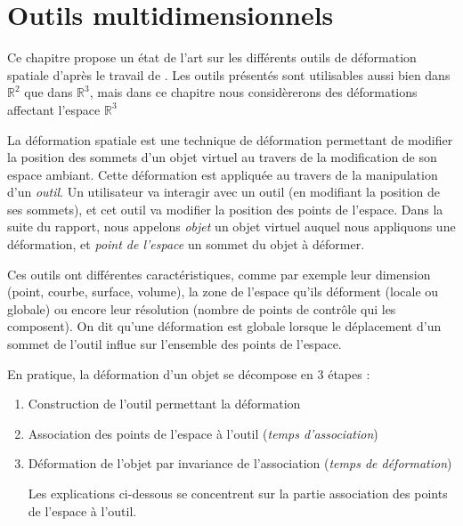

\chapter{Outils multidimensionnels}

\graphicspath{{Chapter1/Chapter1Figs/PNG/}{Chapter1/Chapter1Figs/PDF/}{Chapter1/Chapter1Figs/}}

Ce chapitre propose un état de l'art sur les différents outils de déformation
spatiale d'après le travail de \cite{GB08}. Les outils présentés sont
utilisables aussi bien dans $\mathbb{R}^2$ que dans $\mathbb{R}^3$, mais dans
ce chapitre nous considèrerons des déformations affectant l'espace
$\mathbb{R}^3$

La déformation spatiale est une technique de déformation permettant de
modifier la position des sommets d'un objet virtuel au travers de la
modification de son espace ambiant. Cette déformation est appliquée au travers
de la manipulation d'un \textit{outil}. Un utilisateur va interagir avec un
outil (en modifiant la position de ses sommets), et cet outil va modifier la
position des points de l'espace. Dans la suite du rapport, nous appelons
\textit{objet} un objet virtuel auquel nous appliquons une déformation, et
\textit{point de l'espace} un sommet du objet à déformer.

Ces outils ont différentes caractéristiques, comme par exemple leur dimension
(point, courbe, surface, volume), la zone de l'espace qu'ils déforment (locale
ou globale) ou encore leur résolution (nombre de points de contrôle qui les
composent). On dit qu'une déformation est globale lorsque le déplacement d'un
sommet de l'outil influe sur l'ensemble des points de l'espace.

En pratique, la déformation d'un objet se décompose en 3 étapes :
\begin{enumerate}

\item Construction de l'outil permettant la déformation

\item Association des points de l'espace à l'outil (\textit{temps
d'association})

\item Déformation de l'objet par invariance de l'association (\textit{temps de
déformation})

Les explications ci-dessous se concentrent sur la partie association des
points de l'espace à l'outil.

\end{enumerate} 

